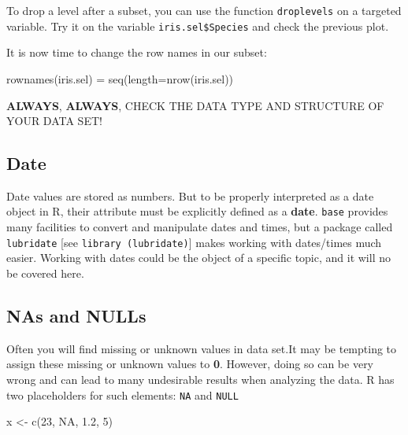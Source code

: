 \documentclass[
]{article}
\newenvironment{Shaded}{\begin{snugshade}}{\end{snugshade}}
\newcommand{\AttributeTok}[1]{\textcolor[rgb]{0.77,0.63,0.00}{#1}}
\newcommand{\ConstantTok}[1]{\textcolor[rgb]{0.00,0.00,0.00}{#1}}
\newcommand{\DecValTok}[1]{\textcolor[rgb]{0.00,0.00,0.81}{#1}}
\newcommand{\FloatTok}[1]{\textcolor[rgb]{0.00,0.00,0.81}{#1}}
\newcommand{\FunctionTok}[1]{\textcolor[rgb]{0.00,0.00,0.00}{#1}}
\newcommand{\NormalTok}[1]{#1}
\newcommand{\OtherTok}[1]{\textcolor[rgb]{0.56,0.35,0.01}{#1}}
\begin{document}
To drop a level after a subset, you can use the function
\texttt{droplevels} on a targeted variable. Try it on the variable
\texttt{iris.sel\$Species} and check the previous plot.

It is now time to change the row names in our subset:

\begin{Shaded}
\begin{Highlighting}[]
\FunctionTok{rownames}\NormalTok{(iris.sel) }\OtherTok{=} \FunctionTok{seq}\NormalTok{(}\AttributeTok{length=}\FunctionTok{nrow}\NormalTok{(iris.sel))}
\end{Highlighting}
\end{Shaded}

{\textbf{ALWAYS}, \textbf{ALWAYS}, CHECK THE DATA TYPE AND STRUCTURE OF
YOUR DATA SET!}

\hypertarget{date}{%
\subsection{Date}\label{date}}

Date values are stored as numbers. But to be properly interpreted as a
date object in R, their attribute must be explicitly defined as a
\textbf{date}. \texttt{base} provides many facilities to convert and
manipulate dates and times, but a package called \texttt{lubridate}
{[}see \texttt{library\ (lubridate)}{]} makes working with dates/times
much easier. Working with dates could be the object of a specific topic,
and it will no be covered here.

\hypertarget{nas-and-nulls}{%
\subsection{NAs and NULLs}\label{nas-and-nulls}}

Often you will find missing or unknown values in data set.It may be
tempting to assign these missing or unknown values to \textbf{0}.
However, doing so can be very wrong and can lead to many undesirable
results when analyzing the data. R has two placeholders for such
elements: \texttt{NA} and \texttt{NULL}

\begin{Shaded}
\begin{Highlighting}[]
\NormalTok{x }\OtherTok{\textless{}{-}} \FunctionTok{c}\NormalTok{(}\DecValTok{23}\NormalTok{, }\ConstantTok{NA}\NormalTok{, }\FloatTok{1.2}\NormalTok{, }\DecValTok{5}\NormalTok{)}
\end{Highlighting}
\end{Shaded}
\end{document}
